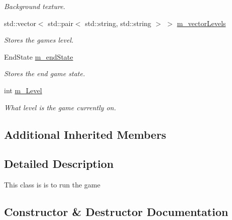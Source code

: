 \begin{DoxyCompactItemize}
\begin{DoxyCompactList}\small\item\em Background texture. \end{DoxyCompactList}\item 
\mbox{\label{class_game_one_ac5334da542d1e258cf355452744a2d90}} 
std\+::vector$<$ std\+::pair$<$ std\+::string, std\+::string $>$ $>$ \mbox{\hyperlink{class_game_one_ac5334da542d1e258cf355452744a2d90}{m\+\_\+vector\+Levels}}
\begin{DoxyCompactList}\small\item\em Stores the games level. \end{DoxyCompactList}\item 
\mbox{\label{class_game_one_adaa91f89bc0a1485c8820ba000b81e53}} 
End\+State \mbox{\hyperlink{class_game_one_adaa91f89bc0a1485c8820ba000b81e53}{m\+\_\+end\+State}}
\begin{DoxyCompactList}\small\item\em Stores the end game state. \end{DoxyCompactList}\item 
\mbox{\label{class_game_one_a6cdca32ede803a28dcad770826af33a3}} 
int \mbox{\hyperlink{class_game_one_a6cdca32ede803a28dcad770826af33a3}{m\+\_\+\+Level}}
\begin{DoxyCompactList}\small\item\em What level is the game currently on. \end{DoxyCompactList}\end{DoxyCompactItemize}
\subsection*{Additional Inherited Members}


\subsection{Detailed Description}
This class is is to run the game 

\subsection{Constructor \& Destructor Documentation}
\mbox{\label{class_game_one_a216b9c400f6e70b7fb6814e8b96d1cc9}} 
